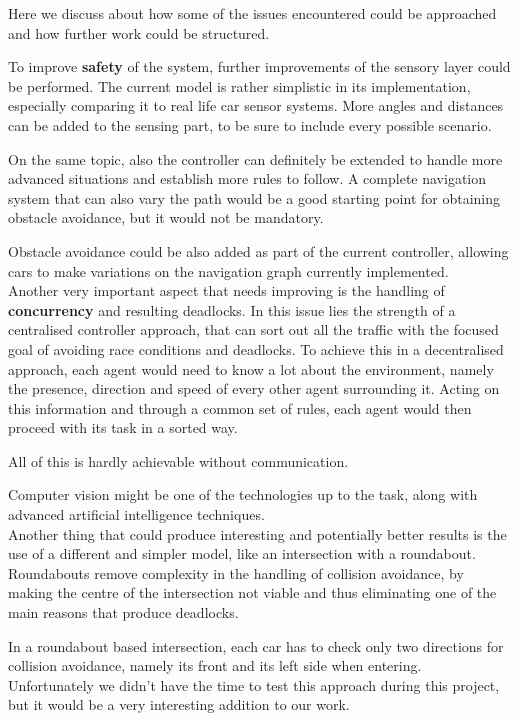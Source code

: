 Here we discuss about how some of the issues encountered could be approached and how further work could be structured.

To improve \textbf{safety} of the system, further improvements of the sensory layer could be performed.
The current model is rather simplistic in its implementation, especially comparing it to real life car sensor systems.
More angles and distances can be added to the sensing part, to be sure to include every possible scenario.

On the same topic, also the controller can definitely be extended to handle more advanced situations and establish more rules to follow. 
A complete navigation system that can also vary the path would be a good starting point for obtaining obstacle avoidance, but it would not be mandatory.

Obstacle avoidance could be also added as part of the current controller, allowing cars to make variations on the navigation graph currently implemented.\\

Another very important aspect that needs improving is the handling of \textbf{concurrency} and resulting deadlocks.
In this issue lies the strength of a centralised controller approach, that can sort out all the traffic with the focused goal of avoiding race conditions and deadlocks.
To achieve this in a decentralised approach, each agent would need to know a lot about the environment, namely the presence, direction and speed of every other agent surrounding it.
Acting on this information and through a common set of rules, each agent would then proceed with its task in a sorted way.

All of this is hardly achievable without communication.

Computer vision might be one of the technologies up to the task, along with advanced artificial intelligence techniques.\\

Another thing that could produce interesting and potentially better results is the use of a different and simpler model, like an intersection with a roundabout.
Roundabouts remove complexity in the handling of collision avoidance, by making the centre of the intersection not viable and thus eliminating one of the main reasons that produce deadlocks.

In a roundabout based intersection, each car has to check only two directions for collision avoidance, namely its front and its left side when entering.
Unfortunately we didn't have the time to test this approach during this project, but it would be a very interesting addition to our work.\\

